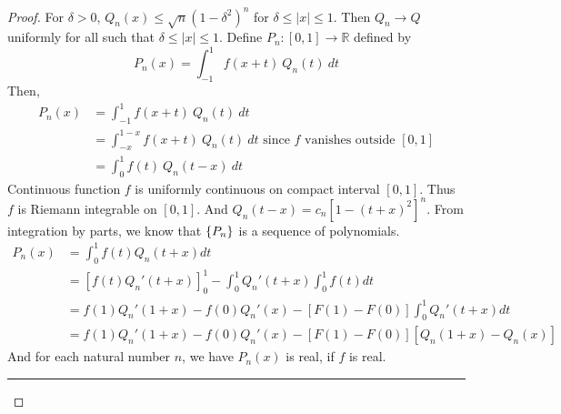 \begin{proof}
	For $\delta > 0$, $Q_n(x) \le \sqrt{n}(1-\delta^2)^n$ for $\delta \le |x| \le 1$.	
	Then $Q_n \to Q$ uniformly for all such that $\delta \le |x| \le 1$.
	Define $P_n : [0,1] \to \mathbb{R}$ defined by 
	\[ P_n(x) = \int_{-1}^1 f(x+t) \ Q_n(t) \ dt \]
	Then,
	\begin{align*}
		P_n(x) & = \int_{-1}^1 f(x+t) \ Q_n(t) \ dt \\
		& = \int_{-x}^{1-x} f(x+t) \ Q_n(t) \ dt \text{ since } f \text{ vanishes outside } [0,1]\\
		& = \int_0^{1} f(t) \ Q_n(t-x) \ dt 
	\end{align*}
	{\color{red}
	Continuous function $f$ is uniformly continuous on compact interval $[0,1]$.
	Thus $f$ is Riemann integrable on $[0,1]$.
	And $Q_n(t-x) = c_n [1-(t+x)^2]^n$.
	From integration by parts, we know that $\left\{P_n\right\}$ is a sequence of polynomials.
	\begin{align*}
		P_n(x) 
		& = \int_0^1 f(t) Q_n(t+x) dt \\
		& = \left[f(t)Q_n'(t+x)\right]_0^1 - \int_0^1 Q_n'(t+x) \int_0^1 f(t) dt\\
		& = f(1)Q_n'(1+x) -f(0)Q_n'(x) - [F(1)-F(0)]\int_0^1 Q_n'(t+x) dt \\
		& = f(1)Q_n'(1+x) - f(0)Q_n'(x) - [F(1)-F(0)] [Q_n(1+x) - Q_n(x)]
	\end{align*}
	}
	And for each natural number $n$, we have $P_n(x)$ is real, if $f$ is real.\\

	\hrule \vspace{1em}


\end{proof}
